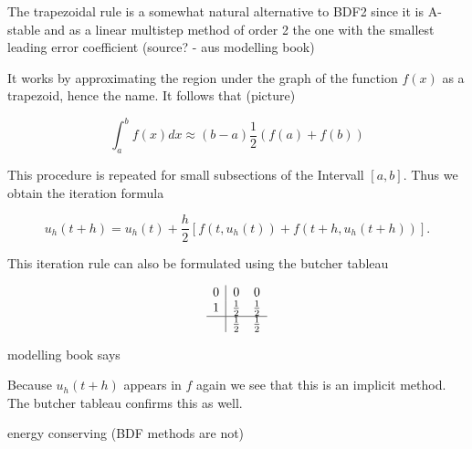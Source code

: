 	The trapezoidal rule is a somewhat natural alternative to BDF2 since it is A-stable and as a linear multistep method of order 2 the one with the smallest leading error coefficient (source? - aus modelling book)
	
	It works by approximating the region under the graph of the function $f(x)$ as a trapezoid, hence the name. It follows that (picture)
	
	\begin{displaymath}
		\int_{a}^{b} f(x) dx \approx (b-a)\frac{1}{2} (f(a)+f(b))
	\end{displaymath}

	This procedure is repeated for small subsections of the Intervall $[a,b]$. Thus we obtain the iteration formula
	
	\begin{displaymath}
		u_h (t+h) = u_h(t) +\frac{h}{2}[f(t,u_h(t)) + f(t+h, u_h(t+h))].
	\end{displaymath}

	This iteration rule can also be formulated using the butcher tableau
	
	
	
	\begin{displaymath}
		\begin{array}{c|cc}
			0 & 0 & 0 \\
			1 & \frac{1}{2} & \frac{1}{2} \\
			\hline
			& \frac{1}{2} & \frac{1}{2}
		\end{array}
	\end{displaymath}
	
	modelling book says
	
	Because $u_h(t+h)$ appears in $f$ again we see that this is an implicit method. The butcher tableau confirms this as well.
	
	energy conserving (BDF methods are not)

		
		
	
	
	